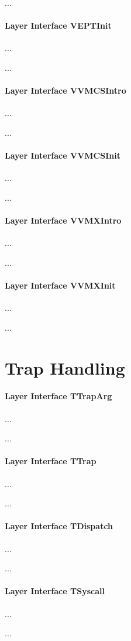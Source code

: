 ...

\paragraph{Layer Interface VEPTInit}
...

...

\paragraph{Layer Interface VVMCSIntro}
...

...

\paragraph{Layer Interface VVMCSInit}
...

...

\paragraph{Layer Interface VVMXIntro}
...

...

\paragraph{Layer Interface VVMXInit}
...

...

\section{Trap Handling}

\paragraph{Layer Interface TTrapArg}
...

...

\paragraph{Layer Interface TTrap}
...

...

\paragraph{Layer Interface TDispatch}
...

...

\paragraph{Layer Interface TSyscall}
...

...